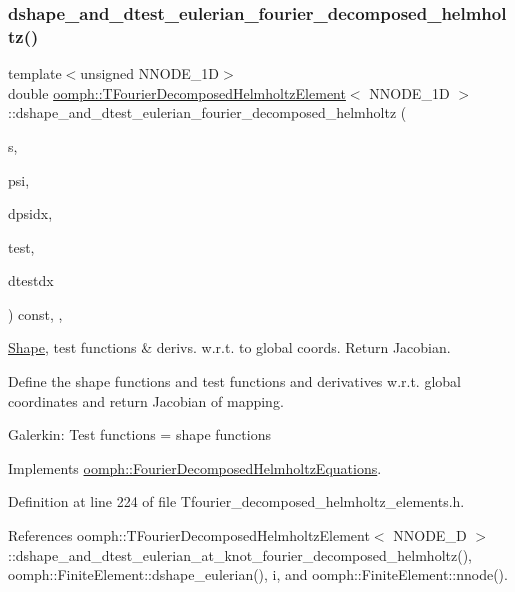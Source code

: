 \subsubsection{\texorpdfstring{dshape\+\_\+and\+\_\+dtest\+\_\+eulerian\+\_\+fourier\+\_\+decomposed\+\_\+helmholtz()}{dshape\_and\_dtest\_eulerian\_fourier\_decomposed\_helmholtz()}}
{\footnotesize\ttfamily template$<$unsigned N\+N\+O\+D\+E\+\_\+1D$>$ \\
double \hyperlink{classoomph_1_1TFourierDecomposedHelmholtzElement}{oomph\+::\+T\+Fourier\+Decomposed\+Helmholtz\+Element}$<$ N\+N\+O\+D\+E\+\_\+1D $>$\+::dshape\+\_\+and\+\_\+dtest\+\_\+eulerian\+\_\+fourier\+\_\+decomposed\+\_\+helmholtz (\begin{DoxyParamCaption}\item[{const \hyperlink{classoomph_1_1Vector}{Vector}$<$ double $>$ \&}]{s,  }\item[{\hyperlink{classoomph_1_1Shape}{Shape} \&}]{psi,  }\item[{\hyperlink{classoomph_1_1DShape}{D\+Shape} \&}]{dpsidx,  }\item[{\hyperlink{classoomph_1_1Shape}{Shape} \&}]{test,  }\item[{\hyperlink{classoomph_1_1DShape}{D\+Shape} \&}]{dtestdx }\end{DoxyParamCaption}) const\hspace{0.3cm}{\ttfamily [inline]}, {\ttfamily [protected]}, {\ttfamily [virtual]}}



\hyperlink{classoomph_1_1Shape}{Shape}, test functions \& derivs. w.\+r.\+t. to global coords. Return Jacobian. 

Define the shape functions and test functions and derivatives w.\+r.\+t. global coordinates and return Jacobian of mapping.

Galerkin\+: Test functions = shape functions 

Implements \hyperlink{classoomph_1_1FourierDecomposedHelmholtzEquations_a9a0a3a0452e40681fbe610bb7a797252}{oomph\+::\+Fourier\+Decomposed\+Helmholtz\+Equations}.



Definition at line 224 of file Tfourier\+\_\+decomposed\+\_\+helmholtz\+\_\+elements.\+h.



References oomph\+::\+T\+Fourier\+Decomposed\+Helmholtz\+Element$<$ N\+N\+O\+D\+E\+\_\+D $>$\+::dshape\+\_\+and\+\_\+dtest\+\_\+eulerian\+\_\+at\+\_\+knot\+\_\+fourier\+\_\+decomposed\+\_\+helmholtz(), oomph\+::\+Finite\+Element\+::dshape\+\_\+eulerian(), i, and oomph\+::\+Finite\+Element\+::nnode().



